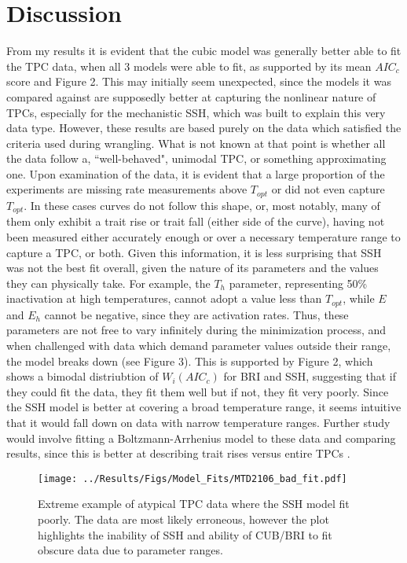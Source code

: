 \documentclass[11pt]{article}
\begin{document}
    \section{Discussion}
        From my results it is evident that the cubic model was generally better able to fit the TPC data, when all 3 models were able to fit, as supported by its mean $AIC_c$ score and Figure 2. This may initially seem unexpected, since the models it was compared against are supposedly better at capturing the nonlinear nature of TPCs, especially for the mechanistic SSH, which was built to explain this very data type. However, these results are based purely on the data which satisfied the criteria used during wrangling. What is not known at that point is whether all the data follow a, ``well-behaved", unimodal TPC, or something approximating one. Upon examination of the data, it is evident that a large proportion of the experiments are missing rate measurements above $T_{opt}$ or did not even capture $T_{opt}$. In these cases curves do not follow this shape, or, most notably, many of them only exhibit a trait rise or trait fall (either side of the curve), having not been measured either accurately enough or over a necessary temperature range to capture a TPC, or both. Given this information, it is less surprising that SSH was not the best fit overall, given the nature of its parameters and the values they can physically take. For example, the $T_h$ parameter, representing 50\% inactivation at high temperatures, cannot adopt a value less than $T_{opt}$, while $E$ and $E_h$ cannot be negative, since they are activation rates. Thus, these parameters are not free to vary infinitely during the minimization process, and when challenged with data which demand parameter values outside their range, the model breaks down (see Figure 3). This is supported by Figure 2, which shows a bimodal distriubtion of $W_i(AIC_c)$ for BRI and SSH, suggesting that if they could fit the data, they fit them well but if not, they fit very poorly. Since the SSH model is better at covering a broad temperature range, it seems intuitive that it would fall down on data with narrow temperature ranges. Further study would involve fitting a Boltzmann-Arrhenius model to these data and comparing results, since this is better at describing trait rises versus entire TPCs .
        

        \begin{figure}
            \begin{center}      
            \texttt{[image: ../Results/Figs/Model\_Fits/MTD2106\_bad\_fit.pdf]}
            \caption{Extreme example of atypical TPC data where the SSH model fit poorly. The data are most likely erroneous, however the plot highlights the inability of SSH and ability of CUB/BRI to fit obscure data due to parameter ranges.}
            \end{center}
        \end{figure}  
\end{document}
